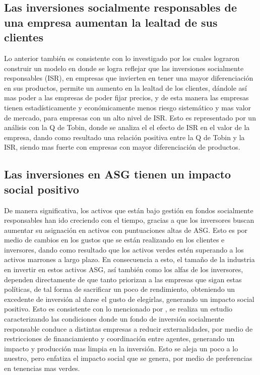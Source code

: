 \subsection{Las inversiones socialmente responsables de una empresa aumentan la lealtad de sus clientes}
Lo anterior también es consistente con lo investigado por  los cuales lograron construir un modelo en donde se logra reflejar que las inversiones socialmente responsables (ISR), en empresas que invierten en tener una mayor diferenciación en sus productos, permite un aumento en la lealtad de los clientes, dándole así mas poder a las empresas de poder fijar precios, y de esta manera las empresas tienen estadísticamente y económicamente menos riesgo sistemático y mas valor de mercado, para empresas con un alto nivel de ISR. Esto es representado por un análisis con la Q de Tobin, donde se analiza el el efecto de ISR en el valor de la empresa, dando como resultado una relación positiva entre la Q de Tobin y la ISR, siendo mas fuerte con empresas con mayor diferenciación de productos.
\vspace{0.5cm}
\subsection{Las inversiones en ASG tienen un impacto social positivo}

De manera significativa, los activos que están bajo gestión en fondos socialmente responsables han ido creciendo con el tiempo, gracias a que los inversores buscan aumentar su asignación en activos con puntuaciones altas de ASG. Esto es por medio de cambios en los gustos que se están realizando en los clientes e inversores, dando como resultado que los activos verdes estén superando a los activos marrones a largo plazo. En consecuencia a esto, el tamaño de la industria en invertir en estos activos ASG, así también como los alfas de los inversores, dependen directamente de que tanto priorizan a las empresas que sigan estas políticas, de tal forma de sacrificar un poco de rendimiento, obteniendo un excedente de inversión al darse el gusto de elegirlas, generando un impacto social positivo. Esto es consistente con lo mencionado por , se realiza un estudio caracterizando las condiciones donde un fondo de inversión socialmente responsable conduce a distintas empresas a reducir externalidades, por medio de restricciones de financiamiento y coordinación entre agentes, generando un impacto y producción mas limpia en la inversión. Esto se aleja un poco a lo nuestro, pero enfatiza el impacto social que se genera, por medio de preferencias en tenencias mas verdes.

